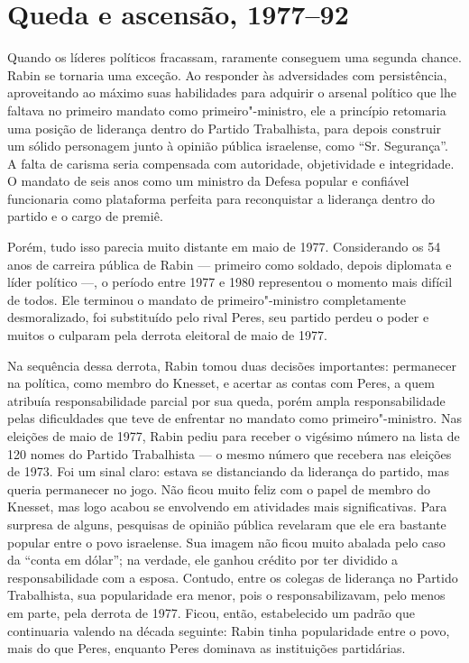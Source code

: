 \chapter[Queda e ascensão, 1977--92]{Queda e ascensão, 1977--92}

Quando os líderes políticos fracassam, raramente conseguem uma segunda
chance. Rabin se tornaria uma exceção. Ao responder às adversidades com
persistência, aproveitando ao máximo suas habilidades para adquirir o
arsenal político que lhe faltava no primeiro mandato como
primeiro"-ministro, ele a princípio retomaria uma posição de liderança
dentro do Partido Trabalhista, para depois construir um sólido
personagem junto à opinião pública israelense, como ``Sr. Segurança''. A
falta de carisma seria compensada com autoridade, objetividade e
integridade. O mandato de seis anos como um ministro da Defesa popular e
confiável funcionaria como plataforma perfeita para reconquistar a
liderança dentro do partido e o cargo de premiê.

Porém, tudo isso parecia muito distante em maio de 1977. Considerando os
54 anos de carreira pública de Rabin --- primeiro como
soldado, depois diplomata e líder político ---, o período entre 1977 e
1980 representou o momento mais difícil de todos. Ele terminou o mandato
de primeiro"-ministro completamente desmoralizado, foi substituído pelo
rival Peres, seu partido perdeu o poder e muitos o culparam pela derrota
eleitoral de maio de 1977.

Na sequência dessa derrota, Rabin tomou duas decisões importantes:
permanecer na política, como membro do Knesset, e acertar as contas com
Peres, a quem atribuía responsabilidade parcial por sua queda, porém
ampla responsabilidade pelas dificuldades que teve de enfrentar no
mandato como primeiro"-ministro. Nas eleições de maio de 1977, Rabin
pediu para receber o vigésimo número na lista de 120 nomes do Partido
Trabalhista --- o mesmo número que recebera nas eleições de 1973. Foi um
sinal claro: estava se distanciando da liderança do partido, mas queria
permanecer no jogo. Não ficou muito feliz com o papel de membro do
Knesset, mas logo acabou se envolvendo em atividades mais
significativas. Para surpresa de alguns, pesquisas de opinião pública
revelaram que ele era bastante popular entre o povo israelense. Sua
imagem não ficou muito abalada pelo caso da ``conta em dólar''; na
verdade, ele ganhou crédito por ter dividido a responsabilidade com a
esposa. Contudo, entre os colegas de liderança no Partido Trabalhista,
sua popularidade era menor, pois o responsabilizavam, pelo menos em
parte, pela derrota de 1977. Ficou, então, estabelecido um padrão que
continuaria valendo na década seguinte: Rabin tinha popularidade entre o
povo, mais do que Peres, enquanto Peres dominava as instituições
partidárias.

